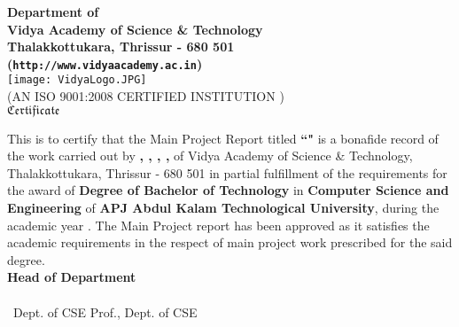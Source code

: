 



\begin{titlepage}


\begin{center}


{\Large \bf Department of \vdept  }\\
{\Large \bf Vidya Academy of Science \& Technology}\\
{\normalsize \bf Thalakkottukara, Thrissur - 680 501\\
({\tt http://www.vidyaacademy.ac.in})}\\[0.75cm]
%
%
\texttt{[image: VidyaLogo.JPG]}\\
\scriptsize (AN ISO 9001:2008 CERTIFIED INSTITUTION )\\[1 cm]
%
 \Huge  $ \mathfrak{Certificate}$\\[0.5cm]
%
\end{center}

\quad This is to certify that the Main Project Report titled {\bf ``\vtitle"} is a bonafide record of the work carried out by {\bf \vauthora , \vauthorb , \vauthorc , \vauthord ,   \vauthore } of Vidya Academy of Science \& Technology, Thalakkottukara, Thrissur - 680 501 in partial fulfillment of the requirements for the award of  {\bf Degree of Bachelor of Technology} in {\bf Computer Science and Engineering} of  {\bf APJ Abdul Kalam Technological University}, during the academic year \vacademicyear. The Main Project report has been approved as it satisfies the academic requirements in the respect of main project work prescribed for the said degree.\\[2 cm]
 
 \hfill  {\bf Head of Department} \\[.3cm]
\noindent \vguide \hfill \vhod \\ \vguidedg\ Dept. of CSE \hfill Prof., Dept. of CSE  



%
\end{titlepage}

%  